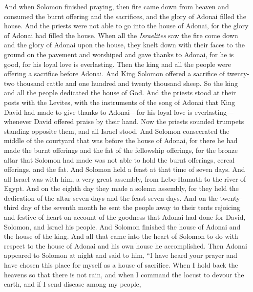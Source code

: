 \begin{biblechapter} %
 And when Solomon finished praying, then fire came down from heaven and consumed the burnt offering and the sacrifices, and the glory of Adonai filled the house.
\verse And the priests were not able to go into the house of Adonai, for the glory of Adonai had filled the house.
\verse When all the \textit{Israelites} saw the fire come down and the glory of Adonai upon the house, they knelt down with their faces to the ground on the pavement and worshiped and gave thanks to Adonai, for he is good, for his loyal love is everlasting.
 Then the king and all the people were offering a sacrifice before Adonai.
\verse And King Solomon offered a sacrifice of twenty-two thousand cattle and one hundred and twenty thousand sheep. So the king and all the people dedicated the house of God.
\verse And the priests stood at their posts with the Levites, with the instruments of the song of Adonai that King David had made to give thanks to Adonai—for his loyal love is everlasting—whenever David offered praise by their hand. Now the priests sounded trumpets standing opposite them, and all Israel stood.
\verse And Solomon consecrated the middle of the courtyard that was before the house of Adonai, for there he had made the burnt offerings and the fat of the fellowship offerings, for the bronze altar that Solomon had made was not able to hold the burnt offerings, cereal offerings, and the fat.
\verse And Solomon held a feast at that time of seven days. And all Israel was with him, a very great assembly, from Lebo-Hamath to the river of Egypt.
\verse And on the eighth day they made a solemn assembly, for they held the dedication of the altar seven days and the feast seven days.
\verse And on the twenty-third day of the seventh month he sent the people away to their tents rejoicing and festive of heart on account of the goodness that Adonai had done for David, Solomon, and Israel his people.
\verse And Solomon finished the house of Adonai and the house of the king. And all that came into the heart of Solomon to do with respect to the house of Adonai and his own house he accomplished.
 Then Adonai appeared to Solomon at night and said to him, “I have heard your prayer and have chosen this place for myself as a house of sacrifice.
\verse When I hold back the heavens so that there is not rain, and when I command the locust to devour the earth, and if I send disease among my people,

\end{biblechapter}
